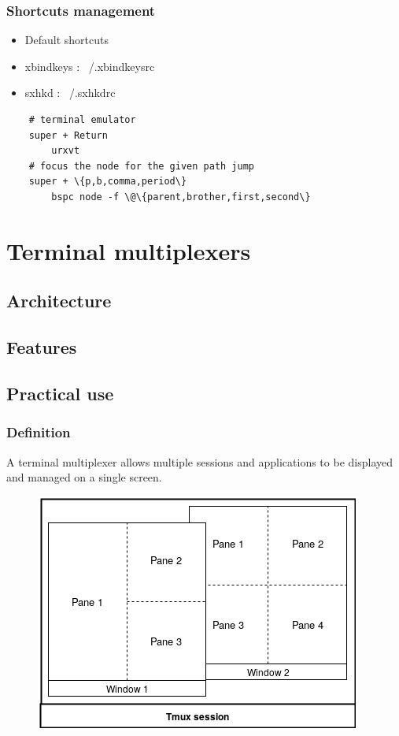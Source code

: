 \documentclass[aspectratio=169]{beamer}
\begin{document}
\begin{frame}[fragile]
    \frametitle{Shortcuts management}
  \begin{itemize}
    \item Default shortcuts
    \item xbindkeys : ~/.xbindkeysrc
    \item sxhkd : ~/.sxhkdrc
  \end{itemize}
  \begin{lstlisting}
    # terminal emulator
    super + Return
        urxvt
    # focus the node for the given path jump
    super + \{p,b,comma,period\}
        bspc node -f \@\{parent,brother,first,second\}
   \end{lstlisting}
\end{frame}

\section{Terminal multiplexers}
\subsection{Architecture}
\subsection{Features}
\subsection{Practical use}

\begin{frame}
  \frametitle{Definition}
  A terminal multiplexer allows multiple sessions and applications to be displayed and managed on a single screen.
    \begin{figure}[h]
        \includegraphics[scale=0.5]{./images/tmux_panes.png}
    \end{figure}
\end{frame}
\end{document}
